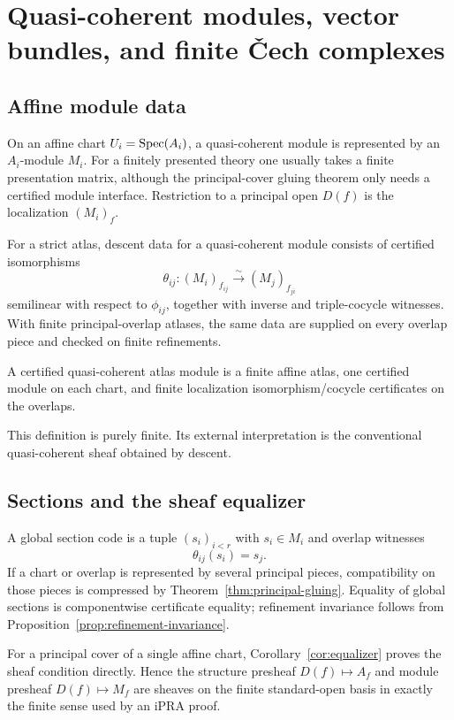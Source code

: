 \section{Quasi-coherent modules, vector bundles, and finite \v{C}ech complexes}

\subsection{Affine module data}

On an affine chart $U_i=\operatorname{Spec}(A_i)$, a quasi-coherent module is represented by an $A_i$-module
$M_i$.  For a finitely presented theory one usually takes a finite presentation matrix, although the
principal-cover gluing theorem only needs a certified module interface.  Restriction to a principal
open $D(f)$ is the localization $(M_i)_f$.

For a strict atlas, descent data for a quasi-coherent module consists of certified isomorphisms
\[
   \theta_{ij}:(M_i)_{f_{ij}}
      \xrightarrow{\sim}
      (M_j)_{f_{ji}}
\]
semilinear with respect to $\phi_{ij}$, together with inverse and triple-cocycle witnesses.  With
finite principal-overlap atlases, the same data are supplied on every overlap piece and checked on
finite refinements.

\begin{definition}
A certified quasi-coherent atlas module is a finite affine atlas, one certified module on each chart,
and finite localization isomorphism/cocycle certificates on the overlaps.
\end{definition}

This definition is purely finite.  Its external interpretation is the conventional quasi-coherent
sheaf obtained by descent.

\subsection{Sections and the sheaf equalizer}

A global section code is a tuple $(s_i)_{i<r}$ with $s_i\in M_i$ and overlap witnesses
\[
                    \theta_{ij}(s_i)=s_j.
\]
If a chart or overlap is represented by several principal pieces, compatibility on those pieces is
compressed by Theorem~\ref{thm:principal-gluing}.  Equality of global sections is componentwise
certificate equality; refinement invariance follows from Proposition~\ref{prop:refinement-invariance}.

For a principal cover of a single affine chart, Corollary~\ref{cor:equalizer} proves the sheaf
condition directly.  Hence the structure presheaf $D(f)\mapsto A_f$ and module presheaf
$D(f)\mapsto M_f$ are sheaves on the finite standard-open basis in exactly the finite sense used by
an iPRA proof.

